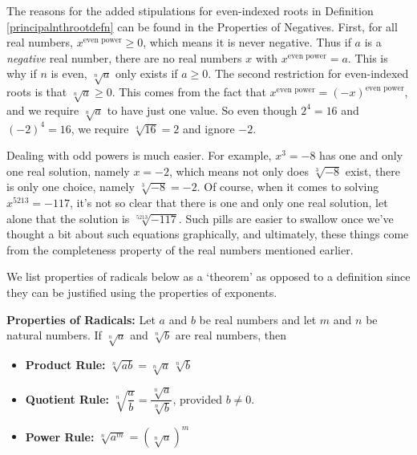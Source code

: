 \medskip

The reasons for the added stipulations for even-indexed roots in Definition \ref{principalnthrootdefn} can be found in the Properties of Negatives.  First, for all real numbers,  $x^{\text{even power}} \geq 0$, which means it is never negative.  Thus if $a$ is a \textit{negative} real number, there are no real numbers $x$ with $x^{\text{even power}} = a$.  This is why if $n$ is even, $\sqrt[n]{a}$ only exists if $a \geq 0$.  The second restriction for even-indexed roots is that $\sqrt[n]{a} \geq 0$.  This comes from the fact that $x^{\text{even power}} = (-x)^{\text{even power}}$, and we require $\sqrt[n]{a}$ to have just one value.  So even though $2^{4} = 16$ and $(-2)^{4} = 16$, we require $\sqrt[4]{16} = 2$ and ignore $-2$.  

\smallskip

Dealing with odd powers is much easier. For example, $x^3 = -8$ has one and only one real solution, namely $x = -2$, which means not only does $\sqrt[3]{-8}$ exist, there is only one choice, namely $\sqrt[3]{-8} = -2$. Of course, when it comes to solving $x^{5213} = -117$, it's not so clear that there is one and only one real solution, let alone that the solution is $\sqrt[5213]{-117}$. Such pills are easier to swallow once we've thought a bit about such equations graphically, and ultimately, these things come from the completeness property of the real numbers mentioned earlier.  

\smallskip

We list properties of radicals below as a `theorem' as opposed to a definition since they can be justified using the properties of exponents.

\medskip

\colorbox{ResultColor}{\bbm
\begin{thm}  \textbf{Properties of Radicals:} Let $a$ and $b$ be real numbers and let $m$ and $n$ be natural numbers.  If $\sqrt[n]{a}$ and $\sqrt[n]{b}$ are real numbers, then

\label{radicalprops}

\begin{itemize}

\item  \textbf{Product Rule:}  $\sqrt[n]{ab} = \sqrt[n]{a} \, \sqrt[n]{b}$ 

\item  \textbf{Quotient Rule:}  $\sqrt[n]{\dfrac{a}{b}} = \dfrac{\sqrt[n]{a}}{\sqrt[n]{b}}$, provided $b \neq 0$. 

\item  \textbf{Power Rule:} $\sqrt[n]{a^m} = \left(\sqrt[n]{a}\right)^m$ 

\end{itemize}

\end{thm}

\ebm}

